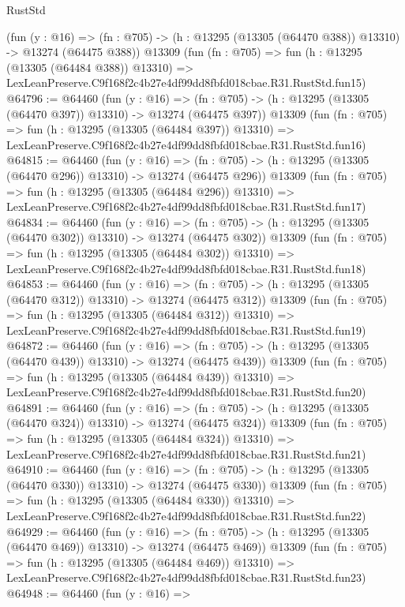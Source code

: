 \begin{lexlean}{RustStd}
\begin{coremodule}
    (fun (y : @16) =>
    (fn : @705) -> (h : @13295 (@13305 (@64470 @388)) @13310) -> @13274 (@64475 @388))
    @13309
    (fun (fn : @705) =>
    fun (h : @13295 (@13305 (@64484 @388)) @13310) =>
    LexLeanPreserve.C9f168f2c4b27e4df99dd8fbfd018cbae.R31.RustStd.fun15)
@64796 := @64460
    (fun (y : @16) =>
    (fn : @705) -> (h : @13295 (@13305 (@64470 @397)) @13310) -> @13274 (@64475 @397))
    @13309
    (fun (fn : @705) =>
    fun (h : @13295 (@13305 (@64484 @397)) @13310) =>
    LexLeanPreserve.C9f168f2c4b27e4df99dd8fbfd018cbae.R31.RustStd.fun16)
@64815 := @64460
    (fun (y : @16) =>
    (fn : @705) -> (h : @13295 (@13305 (@64470 @296)) @13310) -> @13274 (@64475 @296))
    @13309
    (fun (fn : @705) =>
    fun (h : @13295 (@13305 (@64484 @296)) @13310) =>
    LexLeanPreserve.C9f168f2c4b27e4df99dd8fbfd018cbae.R31.RustStd.fun17)
@64834 := @64460
    (fun (y : @16) =>
    (fn : @705) -> (h : @13295 (@13305 (@64470 @302)) @13310) -> @13274 (@64475 @302))
    @13309
    (fun (fn : @705) =>
    fun (h : @13295 (@13305 (@64484 @302)) @13310) =>
    LexLeanPreserve.C9f168f2c4b27e4df99dd8fbfd018cbae.R31.RustStd.fun18)
@64853 := @64460
    (fun (y : @16) =>
    (fn : @705) -> (h : @13295 (@13305 (@64470 @312)) @13310) -> @13274 (@64475 @312))
    @13309
    (fun (fn : @705) =>
    fun (h : @13295 (@13305 (@64484 @312)) @13310) =>
    LexLeanPreserve.C9f168f2c4b27e4df99dd8fbfd018cbae.R31.RustStd.fun19)
@64872 := @64460
    (fun (y : @16) =>
    (fn : @705) -> (h : @13295 (@13305 (@64470 @439)) @13310) -> @13274 (@64475 @439))
    @13309
    (fun (fn : @705) =>
    fun (h : @13295 (@13305 (@64484 @439)) @13310) =>
    LexLeanPreserve.C9f168f2c4b27e4df99dd8fbfd018cbae.R31.RustStd.fun20)
@64891 := @64460
    (fun (y : @16) =>
    (fn : @705) -> (h : @13295 (@13305 (@64470 @324)) @13310) -> @13274 (@64475 @324))
    @13309
    (fun (fn : @705) =>
    fun (h : @13295 (@13305 (@64484 @324)) @13310) =>
    LexLeanPreserve.C9f168f2c4b27e4df99dd8fbfd018cbae.R31.RustStd.fun21)
@64910 := @64460
    (fun (y : @16) =>
    (fn : @705) -> (h : @13295 (@13305 (@64470 @330)) @13310) -> @13274 (@64475 @330))
    @13309
    (fun (fn : @705) =>
    fun (h : @13295 (@13305 (@64484 @330)) @13310) =>
    LexLeanPreserve.C9f168f2c4b27e4df99dd8fbfd018cbae.R31.RustStd.fun22)
@64929 := @64460
    (fun (y : @16) =>
    (fn : @705) -> (h : @13295 (@13305 (@64470 @469)) @13310) -> @13274 (@64475 @469))
    @13309
    (fun (fn : @705) =>
    fun (h : @13295 (@13305 (@64484 @469)) @13310) =>
    LexLeanPreserve.C9f168f2c4b27e4df99dd8fbfd018cbae.R31.RustStd.fun23)
@64948 := @64460
    (fun (y : @16) =>

\end{coremodule}
\end{lexlean}
